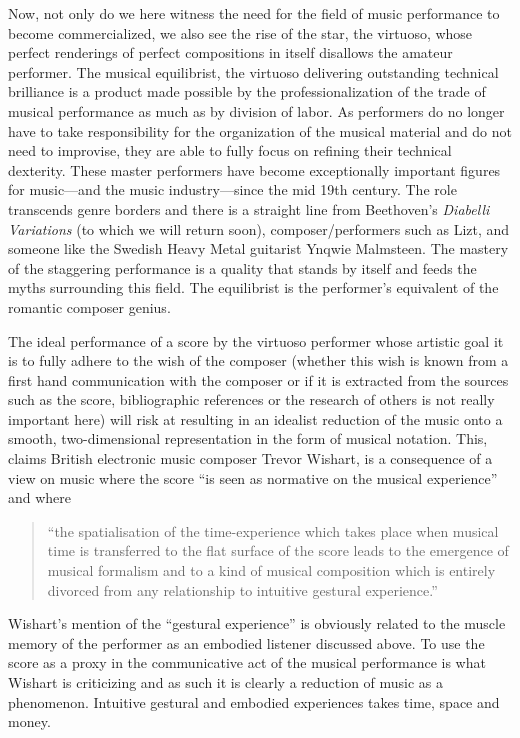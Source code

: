 \documentclass[11pt]{article}
\begin{document}
Now, not only do we here witness the need for the field of music performance to become commercialized, we also see the rise of the star, the virtuoso, whose perfect renderings of perfect compositions in itself disallows the amateur performer. The musical equilibrist, the virtuoso delivering outstanding technical brilliance is a product made possible by the professionalization of the trade of musical performance as much as by division of labor. As performers do no longer have to take responsibility for the organization of the musical material and do not need to improvise, they are able to fully focus on refining their technical dexterity. These master performers have become exceptionally important figures for music---and the music industry---since the mid 19th century. The role transcends genre borders and there is a straight line from Beethoven's \emph{Diabelli Variations} (to which we will return soon), composer/performers such as Lizt, and someone like the Swedish Heavy Metal guitarist Ynqwie Malmsteen. The mastery of the staggering performance is a quality that stands by itself and feeds the myths surrounding this field. The equilibrist is the performer's equivalent of the romantic composer genius.

The ideal performance of a score by the virtuoso performer whose artistic goal it is to fully adhere to the wish of the composer (whether this wish is known from a first hand communication with the composer or if it is extracted from the sources such as the score, bibliographic references or the research of others is not really important here) will risk at resulting in an idealist reduction of the music onto a smooth, two-dimensional representation in the form of musical notation. This, claims British electronic music composer Trevor Wishart, is a consequence of a view on music where the score ``is seen as normative on the musical experience'' and where 

\begin{quote}
  ``the spatialisation of the time-experience which takes place when
  musical time is transferred to the flat surface of the score leads
  to the emergence of musical formalism and to a kind of musical
  composition which is entirely divorced from any relationship to
  intuitive gestural experience.'' \citep[p.35]{wis96}
\end{quote}
Wishart's mention of the ``gestural experience'' is obviously related to the muscle memory of the performer as an embodied listener discussed above. To use the score as a proxy in the communicative act of the musical performance is what Wishart is criticizing and as such it is clearly a reduction of music as a phenomenon. Intuitive gestural and embodied experiences takes time, space and money.
\end{document}
